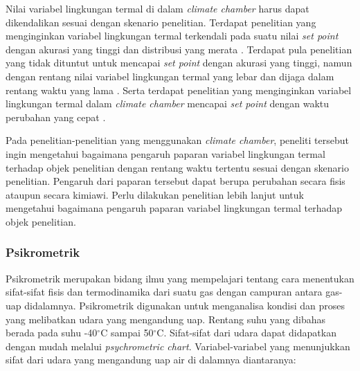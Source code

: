 Nilai variabel lingkungan termal di dalam \textit{climate chamber} harus dapat dikendalikan sesuai dengan skenario penelitian. Terdapat penelitian yang menginginkan variabel lingkungan termal terkendali pada suatu nilai \textit{set point} dengan akurasi yang tinggi dan distribusi yang merata \cite{paper31WHe}. Terdapat pula penelitian yang tidak dituntut untuk mencapai \textit{set point} dengan akurasi yang tinggi, namun dengan rentang nilai variabel lingkungan termal yang lebar dan dijaga dalam rentang waktu yang lama \cite{paper31APLeskinen, paper31AHuguet, paper31EJofre, paper31Srinivasa}. Serta terdapat penelitian yang menginginkan variabel lingkungan termal dalam \textit{climate chamber} mencapai \textit{set point} dengan waktu perubahan yang cepat \cite{paper31Emartinez}.

Pada penelitian-penelitian yang menggunakan \textit{climate chamber}, peneliti tersebut ingin mengetahui bagaimana pengaruh paparan variabel lingkungan termal terhadap objek penelitian dengan rentang waktu tertentu sesuai dengan skenario penelitian.
Pengaruh dari paparan tersebut dapat berupa perubahan secara fisis ataupun secara kimiawi. Perlu dilakukan penelitian lebih lanjut untuk mengetahui bagaimana pengaruh paparan variabel lingkungan termal terhadap objek penelitian.

\subsubsection{Psikrometrik}

Psikrometrik merupakan bidang ilmu yang mempelajari tentang cara menentukan sifat-sifat fisis dan termodinamika dari suatu gas dengan campuran antara gas-uap didalamnya. Psikrometrik digunakan untuk menganalisa kondisi dan proses yang melibatkan udara yang mengandung uap. Rentang suhu yang dibahas berada pada suhu -40$^\circ$C sampai 50$^\circ$C. Sifat-sifat dari udara dapat didapatkan dengan mudah melalui \textit{psychrometric chart}. Variabel-variabel yang menunjukkan sifat dari udara yang mengandung uap air di dalamnya diantaranya: \cite{skripsiIchfan}

